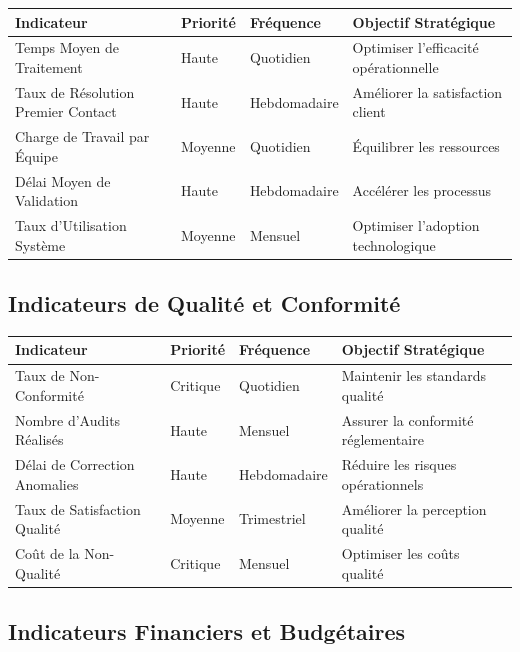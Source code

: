 \documentclass[12pt,a4paper]{article}
\begin{document}
\begin{longtable}{|p{4cm}|p{2cm}|p{2cm}|p{5cm}|}
\hline
\rowcolor{lightgray}
\textbf{Indicateur} & \textbf{Priorité} & \textbf{Fréquence} & \textbf{Objectif Stratégique} \\
\hline
\endhead

Temps Moyen de Traitement & Haute & Quotidien & Optimiser l'efficacité opérationnelle \\
\hline
Taux de Résolution Premier Contact & Haute & Hebdomadaire & Améliorer la satisfaction client \\
\hline
Charge de Travail par Équipe & Moyenne & Quotidien & Équilibrer les ressources \\
\hline
Délai Moyen de Validation & Haute & Hebdomadaire & Accélérer les processus \\
\hline
Taux d'Utilisation Système & Moyenne & Mensuel & Optimiser l'adoption technologique \\
\hline
\end{longtable}

\subsection{Indicateurs de Qualité et Conformité}

\begin{longtable}{|p{4cm}|p{2cm}|p{2cm}|p{5cm}|}
\hline
\rowcolor{lightgray}
\textbf{Indicateur} & \textbf{Priorité} & \textbf{Fréquence} & \textbf{Objectif Stratégique} \\
\hline
\endhead

Taux de Non-Conformité & Critique & Quotidien & Maintenir les standards qualité \\
\hline
Nombre d'Audits Réalisés & Haute & Mensuel & Assurer la conformité réglementaire \\
\hline
Délai de Correction Anomalies & Haute & Hebdomadaire & Réduire les risques opérationnels \\
\hline
Taux de Satisfaction Qualité & Moyenne & Trimestriel & Améliorer la perception qualité \\
\hline
Coût de la Non-Qualité & Critique & Mensuel & Optimiser les coûts qualité \\
\hline
\end{longtable}

\subsection{Indicateurs Financiers et Budgétaires}
\end{document}
